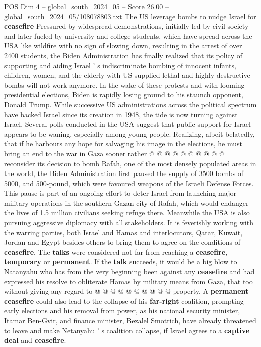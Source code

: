 \begin{textsample}{POS Dim 4 – global\_south\_2024\_05 – Score 26.00 – global\_south\_2024\_05/108078803.txt}  \label{ex:f4_pos_204}
The US leverage bombs to nudge Israel for \textbf{ceasefire} Pressured by widespread demonstrations, initially led by civil society and later fueled by university and college students, which have spread across the USA like wildfire with no sign of slowing down, resulting in the arrest of over 2400 students, the Biden Administration has finally realized that its policy of supporting and aiding Israel ' s indiscriminate bombing of innocent infants, children, women, and the elderly with US-supplied lethal and highly destructive bombs will not work anymore.
In the wake of these protests and with looming presidential elections, Biden is rapidly losing ground to his staunch opponent, Donald Trump.
While successive US administrations across the political spectrum have backed Israel since its creation in 1948, the tide is now turning against Israel.
Several polls conducted in the USA suggest that public support for Israel appears to be waning, especially among young people.
Realizing, albeit belatedly, that if he harbours any hope for salvaging his image in the elections, he must bring an end to the war in Gaza sooner rather @ @ @ @ @ @ @ @ @ @ reconsider its decision to bomb Rafah, one of the most densely populated areas in the world, the Biden Administration first paused the supply of 3500 bombs of 5000, and 500-pound, which were favoured weapons of the Israeli Defense Forces.
This pause is part of an ongoing effort to deter Israel from launching major military operations in the southern Gazan city of Rafah, which would endanger the lives of 1.5 million civilians seeking refuge there.
Meanwhile the USA is also pursuing aggressive diplomacy with all stakeholders.
It is feverishly working with the warring parties, both Israel and Hamas and interlocutors, Qatar, Kuwait, Jordan and Egypt besides others to bring them to agree on the conditions of \textbf{ceasefire}.
The \textbf{talks} were considered not far from reaching a \textbf{ceasefire}, \textbf{temporary} or \textbf{permanent}.
If the \textbf{talk} succeeds, it would be a big blow to Natanyahu who has from the very beginning been against any \textbf{ceasefire} and had expressed his resolve to obliterate Hamas by military means from Gaza, that too without giving any regard to @ @ @ @ @ @ @ @ @ @ property.
A \textbf{permanent} \textbf{ceasefire} could also lead to the collapse of his \textbf{far-right} coalition, prompting early elections and his removal from power, as his national security minister, Itamar Ben-Gvir, and finance minister, Bezalel Smotrich, have already threatened to leave and make Netanyahu ' s coalition collapse, if Israel agrees to a \textbf{captive} \textbf{deal} and \textbf{ceasefire}.

\end{textsample}
